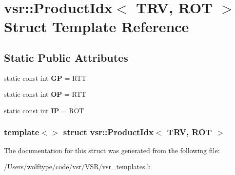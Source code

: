 \hypertarget{structvsr_1_1_product_idx_3_01_t_r_v_00_01_r_o_t_01_4}{\section{vsr\-:\-:Product\-Idx$<$ T\-R\-V, R\-O\-T $>$ Struct Template Reference}
\label{structvsr_1_1_product_idx_3_01_t_r_v_00_01_r_o_t_01_4}
}
\subsection*{Static Public Attributes}
\begin{DoxyCompactItemize}
\item 
\hypertarget{structvsr_1_1_product_idx_3_01_t_r_v_00_01_r_o_t_01_4_aa30cc7edd477ee4dc8d3a37524f94453}{static const int {\bfseries G\-P} = R\-T\-T}\label{structvsr_1_1_product_idx_3_01_t_r_v_00_01_r_o_t_01_4_aa30cc7edd477ee4dc8d3a37524f94453}

\item 
\hypertarget{structvsr_1_1_product_idx_3_01_t_r_v_00_01_r_o_t_01_4_a5afa63b17586be8c2abd548dfcfb699d}{static const int {\bfseries O\-P} = R\-T\-T}\label{structvsr_1_1_product_idx_3_01_t_r_v_00_01_r_o_t_01_4_a5afa63b17586be8c2abd548dfcfb699d}

\item 
\hypertarget{structvsr_1_1_product_idx_3_01_t_r_v_00_01_r_o_t_01_4_abfecd78415febe378ede41e35b254f6e}{static const int {\bfseries I\-P} = R\-O\-T}\label{structvsr_1_1_product_idx_3_01_t_r_v_00_01_r_o_t_01_4_abfecd78415febe378ede41e35b254f6e}

\end{DoxyCompactItemize}
\subsubsection*{template$<$$>$ struct vsr\-::\-Product\-Idx$<$ T\-R\-V, R\-O\-T $>$}



The documentation for this struct was generated from the following file\-:\begin{DoxyCompactItemize}
\item 
/\-Users/wolftype/code/vsr/\-V\-S\-R/vsr\-\_\-templates.\-h\end{DoxyCompactItemize}
